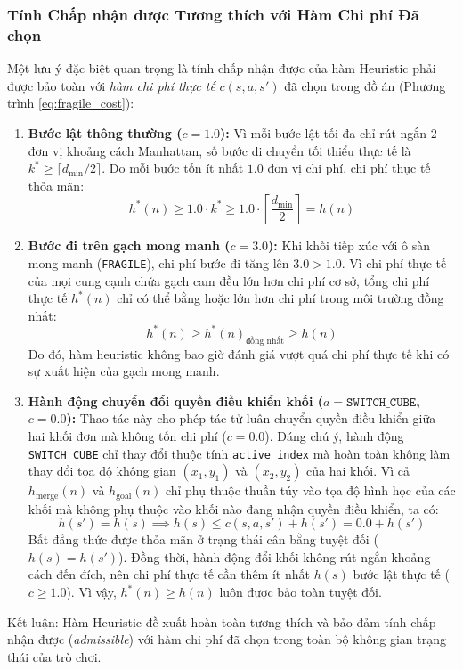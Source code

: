 \subsubsection{Tính Chấp nhận được Tương thích với Hàm Chi phí Đã chọn}
Một lưu ý đặc biệt quan trọng là tính chấp nhận được của hàm Heuristic phải được bảo toàn
với \textit{hàm chi phí thực tế} $c(s, a, s')$ đã chọn trong đồ án (Phương trình \ref{eq:fragile_cost}):

\begin{enumerate}[1.]
    \item \textbf{Bước lật thông thường ($c = 1.0$):}
    Vì mỗi bước lật tối đa chỉ rút ngắn $2$ đơn vị khoảng cách Manhattan, số bước di chuyển tối thiểu
    thực tế là $k^* \ge \lceil d_{\min} / 2 \rceil$. Do mỗi bước tốn ít nhất $1.0$ đơn vị chi phí,
    chi phí thực tế thỏa mãn:
    \begin{equation}
        h^*(n) \ge 1.0 \cdot k^* \ge 1.0 \cdot \left\lceil \frac{d_{\min}}{2} \right\rceil = h(n)
    \end{equation}

    \item \textbf{Bước đi trên gạch mong manh ($c = 3.0$):}
    Khi khối tiếp xúc với ô sàn mong manh (\texttt{FRAGILE}), chi phí bước đi tăng lên $3.0 > 1.0$.
    Vì chi phí thực tế của mọi cung cạnh chứa gạch cam đều lớn hơn chi phí cơ sở, tổng chi phí thực tế
    $h^*(n)$ chỉ có thể bằng hoặc lớn hơn chi phí trong môi trường đồng nhất:
    \begin{equation}
        h^*(n) \ge h^*(n)_{\text{đồng nhất}} \ge h(n)
    \end{equation}
    Do đó, hàm heuristic không bao giờ đánh giá vượt quá chi phí thực tế khi có sự xuất hiện của gạch mong manh.

    \item \textbf{Hành động chuyển đổi quyền điều khiển khối ($a = \texttt{SWITCH\_CUBE}$, $c = 0.0$):}
    Thao tác này cho phép tác tử luân chuyển quyền điều khiển giữa hai khối đơn mà không tốn chi phí ($c = 0.0$).
    Đáng chú ý, hành động \texttt{SWITCH\_CUBE} chỉ thay đổi thuộc tính \texttt{active\_index} mà hoàn toàn
    không làm thay đổi tọa độ không gian $(x_1, y_1)$ và $(x_2, y_2)$ của hai khối.
    Vì cả $h_{\text{merge}}(n)$ và $h_{\text{goal}}(n)$ chỉ phụ thuộc thuần túy vào tọa độ hình học của các khối
    mà không phụ thuộc vào khối nào đang nhận quyền điều khiển, ta có:
    \begin{equation}
        h(s') = h(s) \implies h(s) \le c(s, a, s') + h(s') = 0.0 + h(s')
    \end{equation}
    Bất đẳng thức được thỏa mãn ở trạng thái cân bằng tuyệt đối ($h(s) = h(s')$). Đồng thời, hành động đổi khối
    không rút ngắn khoảng cách đến đích, nên chi phí thực tế cần thêm ít nhất $h(s)$ bước lật thực tế ($c \ge 1.0$).
    Vì vậy, $h^*(n) \ge h(n)$ luôn được bảo toàn tuyệt đối.
\end{enumerate}
Kết luận: Hàm Heuristic đề xuất hoàn toàn tương thích và bảo đảm tính chấp nhận được (\textit{admissible})
với hàm chi phí đã chọn trong toàn bộ không gian trạng thái của trò chơi.

